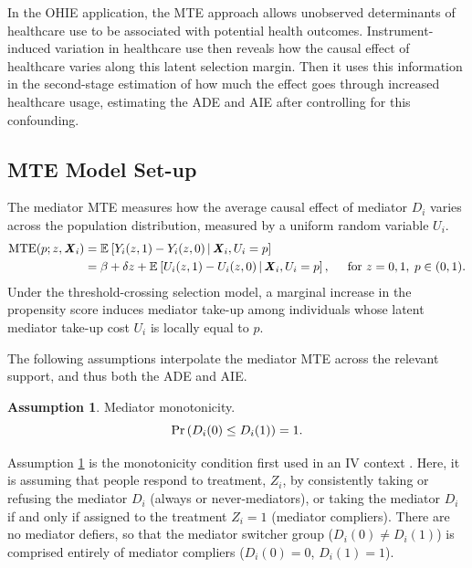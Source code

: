 In the OHIE application, the MTE approach allows unobserved determinants of healthcare use to be associated with potential health outcomes. Instrument-induced variation in healthcare use then reveals how the causal effect of healthcare varies along this latent selection margin.
Then it uses this information in the second-stage estimation of how much the effect goes through increased healthcare usage, estimating the ADE and AIE after controlling for this confounding.

\subsection{MTE Model Set-up}
The mediator MTE measures how the average causal effect of mediator $D_i$ varies across the population distribution, measured by a uniform random variable $U_i$.
\begin{align*}
    \operatorname{MTE}(p; z, \boldsymbol{\mathit{X}}_i)
    &= \mathbb{E}_{} \left[ Y_i(z, 1) - Y_i(z, 0) \, \middle\vert \, \boldsymbol{\mathit{X}}_i, U_i = p \right]\\
    &= \beta + \delta z + \mathbb{E}_{} \left[ U_i(z, 1) - U_i(z, 0) \, \middle\vert \, \boldsymbol{\mathit{X}}_i, U_i = p \right],
    \;\;\;\; \text{ for } z = 0,1,\;p \in (0,1).
\end{align*}
Under the threshold-crossing selection model, a marginal increase in the propensity score induces mediator take-up among individuals whose latent mediator take-up cost $U_i$ is locally equal to $p$.

The following assumptions interpolate the mediator MTE across the relevant support, and thus both the ADE and AIE.

\theoremstyle{definition}
\newtheorem{assumptionMTE}{Assumption}
\renewcommand\theassumptionMTE{MTE--\arabic{assumptionMTE}}
\begin{assumptionMTE}
    \label{mte:monotonicity}
    Mediator monotonicity.
    \[ \Pr\left(  D_i(0) \leq D_i(1)  \right) = 1. \]
\end{assumptionMTE}
Assumption \ref{mte:monotonicity} is the monotonicity condition first used in an IV context \citep{imbens1994identification}.
Here, it is assuming that people respond to treatment, $Z_i$, by consistently taking or refusing the mediator $D_i$ (always or never-mediators), or taking the mediator $D_i$ if and only if assigned to the treatment $Z_i=1$ (mediator compliers).
There are no mediator defiers, so that the mediator switcher group ($D_i(0) \neq D_i(1)$) is comprised entirely of mediator compliers ($D_i(0) =0$, $D_i(1)=1$).

